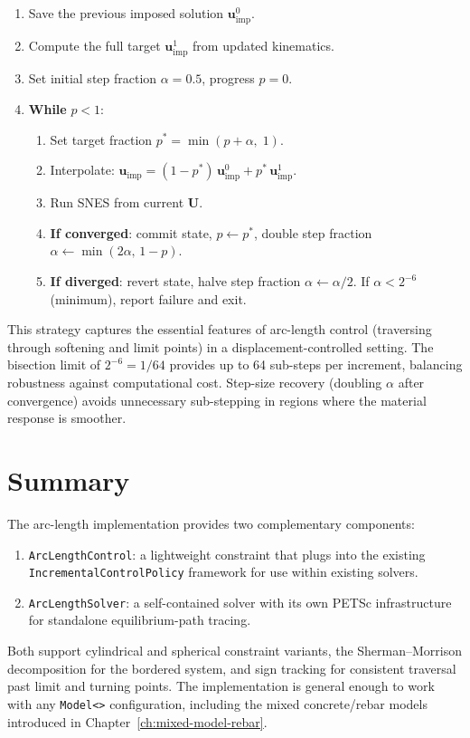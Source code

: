 \begin{enumerate}
  \item Save the previous imposed solution $\mathbf{u}^0_{\text{imp}}$.
  \item Compute the full target $\mathbf{u}^1_{\text{imp}}$ from
    updated kinematics.
  \item Set initial step fraction $\alpha = 0.5$, progress $p = 0$.
  \item \textbf{While} $p < 1$:
    \begin{enumerate}
      \item Set target fraction $p^* = \min(p + \alpha,\; 1)$.
      \item Interpolate: $\mathbf{u}_{\text{imp}} =
        (1 - p^*)\,\mathbf{u}^0_{\text{imp}}
        + p^*\,\mathbf{u}^1_{\text{imp}}$.
      \item Run SNES from current $\mathbf{U}$.
      \item \textbf{If converged}: commit state, $p \leftarrow p^*$,
        double step fraction $\alpha \leftarrow \min(2\alpha,\,1-p)$.
      \item \textbf{If diverged}: revert state, halve step fraction
        $\alpha \leftarrow \alpha/2$.  If $\alpha < 2^{-6}$ (minimum),
        report failure and exit.
    \end{enumerate}
\end{enumerate}

This strategy captures the essential features of arc-length control
(traversing through softening and limit points) in a
displacement-controlled setting.  The bisection limit of $2^{-6} =
1/64$ provides up to 64 sub-steps per increment, balancing robustness
against computational cost.  Step-size recovery (doubling $\alpha$
after convergence) avoids unnecessary sub-stepping in regions where
the material response is smoother.


\section{Summary}
\label{sec:arc-summary}

The arc-length implementation provides two complementary components:
\begin{enumerate}
  \item \texttt{ArcLengthControl}: a lightweight constraint that plugs
    into the existing \texttt{IncrementalControlPolicy} framework for
    use within existing solvers.
  \item \texttt{ArcLengthSolver}: a self-contained solver with its own
    PETSc infrastructure for standalone equilibrium-path tracing.
\end{enumerate}

Both support cylindrical and spherical constraint variants, the
Sherman--Morrison decomposition for the bordered system, and sign
tracking for consistent traversal past limit and turning points.  The
implementation is general enough to work with any \texttt{Model<>}
configuration, including the mixed concrete/rebar models introduced
in Chapter~\ref{ch:mixed-model-rebar}.
